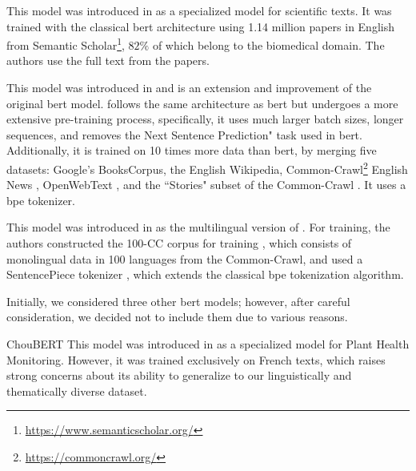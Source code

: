 \label{06_bert_scibert}
This model was introduced in  as a specialized model for scientific texts. It was trained with the classical \gls{bert} architecture using 1.14 million papers in English from Semantic Scholar\footnote{\url{https://www.semanticscholar.org/}}, $82\%$ of which belong to the biomedical domain. The authors use the full text from the papers. 


\label{06_bert_roberta}

This model was introduced in  and is an extension and improvement of the original \gls{bert} model. \bertroberta{} follows the same architecture as \gls{bert} but undergoes a more extensive pre-training process, specifically, it uses much larger batch sizes, longer sequences, and removes the Next Sentence Prediction" task used in \gls{bert}. Additionally, it is trained on 10 times more data than \gls{bert}, by merging five datasets: Google’s BooksCorpus, the English Wikipedia, Common-Crawl\footnote{\url{https://commoncrawl.org/}} English News , OpenWebText , and the ``Stories" subset of the Common-Crawl . It uses a \gls{bpe} tokenizer.

\label{06_bert_xlmroberta}

This model was introduced in  as the multilingual version of \bertroberta{}. For training, the authors constructed the 100-CC corpus for training \bertxlmroberta{}, which consists of monolingual data in 100 languages from the Common-Crawl, and used a SentencePiece tokenizer , which extends the classical \gls{bpe} tokenization algorithm. 





\label{06_bert_excluded_models}

Initially, we considered three other \gls{bert} models; however, after careful consideration, we decided not to include them due to various reasons.



\begin{paragraph}{ChouBERT}
    This model was introduced in
     as a specialized model for Plant Health Monitoring. However, it was trained exclusively on French texts, which raises strong concerns about its ability to generalize to our linguistically and thematically diverse dataset.
\end{paragraph}

